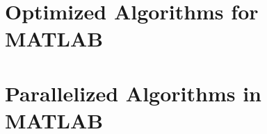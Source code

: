 \section{Optimized Algorithms for MATLAB}
\label{chapter3:optimized_matlab}

\section{Parallelized Algorithms in MATLAB}
\label{chapter3:parallel_matlab}


\newpage
